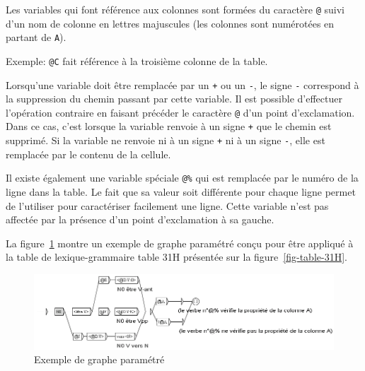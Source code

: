 \bigskip
\noindent Les variables qui font référence aux colonnes sont formées du caractère \verb+@+
 suivi d’un nom de colonne en lettres majuscules (les colonnes sont numérotées
en partant de \verb+A+).

\bigskip
\noindent Exemple: \verb+@C+ fait référence à la troisième colonne de la table.

\bigskip
\noindent Lorsqu’une variable doit être remplacée par un \verb$+$ ou un \verb+-+,
le signe \verb+-+ correspond à la suppression du chemin passant par cette variable.
Il est possible d’effectuer l’opération contraire en faisant précéder le caractère
 \verb+@+ d’un point d’exclamation. Dans ce cas, c’est lorsque la variable renvoie à un signe
\verb$+$ que le chemin est supprimé. Si la variable ne renvoie ni à un signe \verb-+- ni à un signe
\verb+-+, elle est remplacée par le contenu de la cellule.

\bigskip
\noindent Il existe également une variable spéciale \verb+@%+  qui est remplacée
par le numéro de la ligne dans la table. Le fait que sa valeur soit différente pour chaque ligne
permet de l’utiliser pour caractériser facilement une ligne. Cette variable n’est pas affectée par
la présence d’un point d’exclamation à sa gauche.


\bigskip
\noindent La figure~\ref{fig-reference-graph} montre un exemple de graphe paramétré conçu pour être 
appliqué à la table de lexique-grammaire table 31H présentée sur la figure~\ref{fig-table-31H}.

\begin{figure}[!ht]
\begin{center}
\includegraphics[width=15cm]{resources/img/fig8-3.png}
\caption{Exemple de graphe paramétré\label{fig-reference-graph}}
\end{center}
\end{figure}

